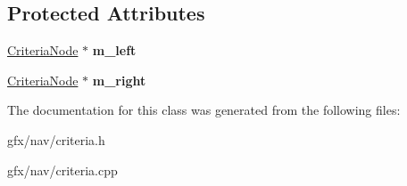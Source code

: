 \subsection*{Protected Attributes}
\begin{DoxyCompactItemize}
\item 
\hyperlink{classCriteriaNode}{Criteria\+Node} $\ast$ {\bfseries m\+\_\+left}\hypertarget{classCriteriaBinaryOperator_ae39db63f27268019145fbcfa1f9a52d6}{}\label{classCriteriaBinaryOperator_ae39db63f27268019145fbcfa1f9a52d6}

\item 
\hyperlink{classCriteriaNode}{Criteria\+Node} $\ast$ {\bfseries m\+\_\+right}\hypertarget{classCriteriaBinaryOperator_aeaa65ed22efbb8d4afae405053357b62}{}\label{classCriteriaBinaryOperator_aeaa65ed22efbb8d4afae405053357b62}

\end{DoxyCompactItemize}


The documentation for this class was generated from the following files\+:\begin{DoxyCompactItemize}
\item 
gfx/nav/criteria.\+h\item 
gfx/nav/criteria.\+cpp\end{DoxyCompactItemize}
